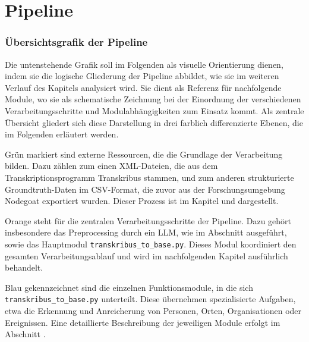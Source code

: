 \documentclass[12pt, a4paper, ngerman, bidi=default]{article}
\newcommand{\code}[1]{\colorbox{VeryLightGray}{\texttt{#1}}} %
\begin{document}
\section{Pipeline}

\subsubsection{Übersichtsgrafik der Pipeline}

Die untenstehende Grafik soll im Folgenden als visuelle Orientierung dienen, 
indem sie die logische Gliederung der Pipeline abbildet, wie sie im weiteren Verlauf des 
Kapitels analysiert wird. Sie dient als Referenz für nachfolgende Module, wo sie als schematische Zeichnung bei der Einordnung
der verschiedenen Verarbeitungsschritte und Modulabhängigkeiten zum Einsatz kommt. 
Als zentrale Übersicht gliedert sich diese Darstellung in drei farblich differenzierte Ebenen, die im Folgenden erläutert werden.

Grün markiert sind externe Ressourcen, die die Grundlage der Verarbeitung bilden. Dazu zählen 
zum einen XML-Dateien, die aus dem Transkriptionsprogramm Transkribus stammen, und zum anderen 
strukturierte Groundtruth-Daten im CSV-Format, die zuvor aus der Forschungsumgebung Nodegoat exportiert 
wurden. Dieser Prozess ist im Kapitel  und  dargestellt.

Orange steht für die zentralen Verarbeitungsschritte der Pipeline. Dazu gehört insbesondere das 
Preprocessing durch ein LLM, wie im Abschnitt  
ausgeführt, sowie das Hauptmodul \code{transkribus\_to\_base.py}. Dieses Modul koordiniert den 
gesamten Verarbeitungsablauf und wird im nachfolgenden Kapitel  ausführlich behandelt.

Blau gekennzeichnet sind die einzelnen Funktionsmodule, in die sich \code{transkribus\_to\_base.py} 
unterteilt. Diese übernehmen spezialisierte Aufgaben, etwa die Erkennung und Anreicherung von Personen, 
Orten, Organisationen oder Ereignissen. Eine detaillierte Beschreibung der jeweiligen Module erfolgt im 
Abschnitt .
\end{document}
